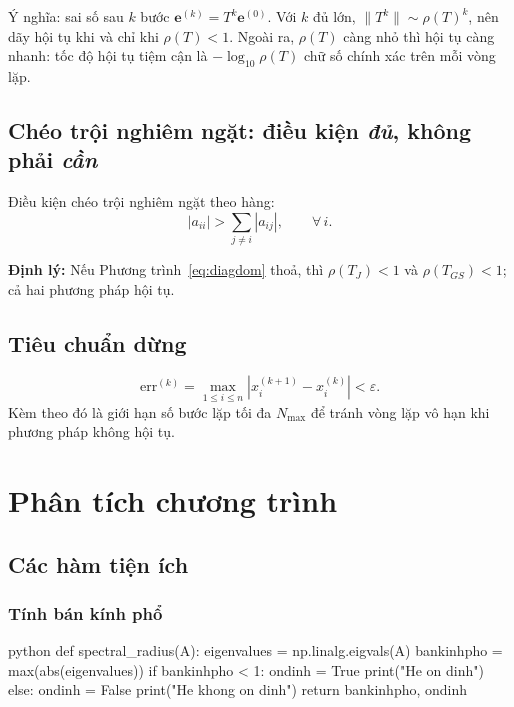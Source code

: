 \documentclass[12pt,a4paper]{article}
\begin{document}
Ý nghĩa: sai số sau $k$ bước $\mathbf{e}^{(k)} = T^k \mathbf{e}^{(0)}$. Với $k$ đủ lớn, $\|T^k\| \sim \rho(T)^k$, nên dãy hội tụ khi và chỉ khi $\rho(T) < 1$. Ngoài ra, $\rho(T)$ càng nhỏ thì hội tụ càng nhanh: tốc độ hội tụ tiệm cận là $-\log_{10}\rho(T)$ chữ số chính xác trên mỗi vòng lặp.

\subsection{Chéo trội nghiêm ngặt: điều kiện \emph{đủ}, không phải \emph{cần}}

Điều kiện chéo trội nghiêm ngặt theo hàng:
\begin{equation}
    |a_{ii}| > \sum_{j\ne i} |a_{ij}|, \qquad \forall\, i.
    \label{eq:diagdom}
\end{equation}

\textbf{Định lý:} Nếu Phương trình~\eqref{eq:diagdom} thoả, thì $\rho(T_J) < 1$ và $\rho(T_{GS}) < 1$; cả hai phương pháp hội tụ.

\subsection{Tiêu chuẩn dừng}

\begin{equation}
    \mathrm{err}^{(k)} = \max_{1\le i\le n} \left| x_i^{(k+1)} - x_i^{(k)} \right| < \varepsilon.
    \label{eq:stop}
\end{equation}
Kèm theo đó là giới hạn số bước lặp tối đa $N_{\max}$ để tránh vòng lặp vô hạn khi phương pháp không hội tụ.

\section{Phân tích chương trình}

\subsection{Các hàm tiện ích}

\subsubsection{Tính bán kính phổ}

\begin{mintedbox}{python}
def spectral_radius(A):
    eigenvalues = np.linalg.eigvals(A)
    bankinhpho = max(abs(eigenvalues))
    if bankinhpho < 1:
        ondinh = True
        print("He on dinh")
    else:
        ondinh = False
        print("He khong on dinh")
    return bankinhpho, ondinh
\end{mintedbox}
\end{document}
